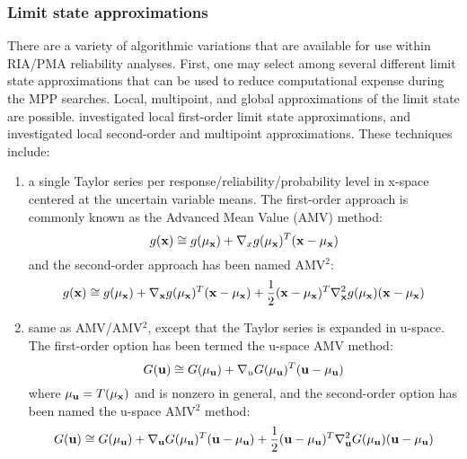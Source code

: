 \subsubsection{Limit state approximations} \label{uq:reliability:local:mpp:approx}

There are a variety of algorithmic variations that are available for
use within RIA/PMA reliability analyses.  First, one may select among
several different limit state approximations that can be used to
reduce computational expense during the MPP searches.  Local,
multipoint, and global approximations of the limit state are possible.
\cite{Eld05} investigated local first-order limit state 
approximations, and \cite{Eld06a} investigated local second-order
and multipoint approximations.  These techniques include:

\begin{enumerate}
\item a single Taylor series per response/reliability/probability level 
in x-space centered at the uncertain variable means.  The first-order 
approach is commonly known as the Advanced Mean Value (AMV) method:
\begin{equation}
g({\bf x}) \cong g(\mu_{\bf x}) + \nabla_x g(\mu_{\bf x})^T 
({\bf x} - \mu_{\bf x}) \label{eq:linear_x_mean}
\end{equation}
and the second-order approach has been named AMV$^2$:
\begin{equation}
g({\bf x}) \cong g(\mu_{\bf x}) + \nabla_{\bf x} g(\mu_{\bf x})^T 
({\bf x} - \mu_{\bf x}) + \frac{1}{2} ({\bf x} - \mu_{\bf x})^T 
\nabla^2_{\bf x} g(\mu_{\bf x}) ({\bf x} - \mu_{\bf x})
\label{eq:taylor2_x_mean}
\end{equation}

\item same as AMV/AMV$^2$, except that the Taylor series is expanded 
in u-space.  The first-order option has been termed the u-space AMV 
method:
\begin{equation}
G({\bf u}) \cong G(\mu_{\bf u}) + \nabla_u G(\mu_{\bf u})^T 
({\bf u} - \mu_{\bf u}) \label{eq:linear_u_mean}
\end{equation}
where $\mu_{\bf u} = T(\mu_{\bf x})$ and is nonzero in general, and 
the second-order option has been named the u-space AMV$^2$ method:
\begin{equation}
G({\bf u}) \cong G(\mu_{\bf u}) + \nabla_{\bf u} G(\mu_{\bf u})^T 
({\bf u} - \mu_{\bf u}) + \frac{1}{2} ({\bf u} - \mu_{\bf u})^T 
\nabla^2_{\bf u} G(\mu_{\bf u}) ({\bf u} - \mu_{\bf u}) 
\label{eq:taylor2_u_mean}
\end{equation}


\end{enumerate}
